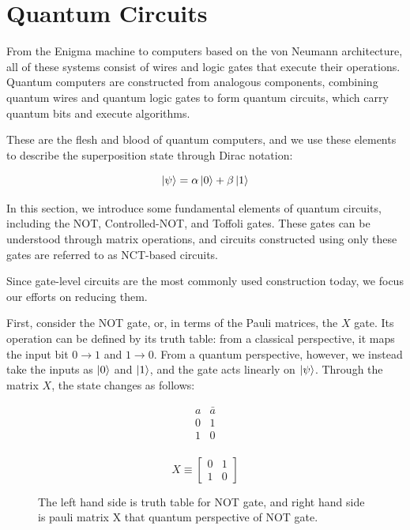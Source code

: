 \section{Quantum Circuits}
From the Enigma machine to computers based on the von Neumann architecture, all of these systems consist of wires and logic gates that execute their operations. Quantum computers are constructed from analogous components, combining quantum wires and quantum logic gates to form quantum circuits, which carry quantum bits and execute algorithms.

These are the flesh and blood of quantum computers, and we use these elements to describe the superposition state through Dirac notation:


\begin{equation}
    \ket{\psi} = \alpha\ket{0} + \beta\ket{1}
\end{equation}

In this section, we introduce some fundamental elements of quantum circuits, including the NOT, Controlled-NOT, and Toffoli gates. These gates can be understood through matrix operations, and circuits constructed using only these gates are referred to as NCT-based circuits.

Since gate-level circuits are the most commonly used construction today, we focus our efforts on reducing them.

First, consider the NOT gate, or, in terms of the Pauli matrices, the $X$ gate. Its operation can be defined by its truth table: from a classical perspective, it maps the input bit $0 \rightarrow 1$ and $1 \rightarrow 0$. From a quantum perspective, however, we instead take the inputs as $\ket{0}$ and $\ket{1}$, and the gate acts linearly on $\ket{\psi}$. Through the matrix $X$, the state changes as follows:

\begin{figure}[htbp]
\centering
\begin{minipage}{0.45\textwidth}
\centering
\begin{displaymath}
\begin{array}{c|c}
\hline
a & \bar{a} \\
\hline
0 & 1  \\
1 & 0  \\
\end{array}
\end{displaymath}
\end{minipage}%
\hfill
\begin{minipage}{0.45\textwidth}
\centering
\[
X \equiv \begin{bmatrix} 0 & 1 \\ 1 & 0 \end{bmatrix}
\]
\end{minipage}
\caption{The left hand side is truth table for NOT gate, and right hand side is pauli matrix X that quantum perspective of NOT gate.}
\label{fig:not-truth-table-and-pauli-x}
\end{figure}

